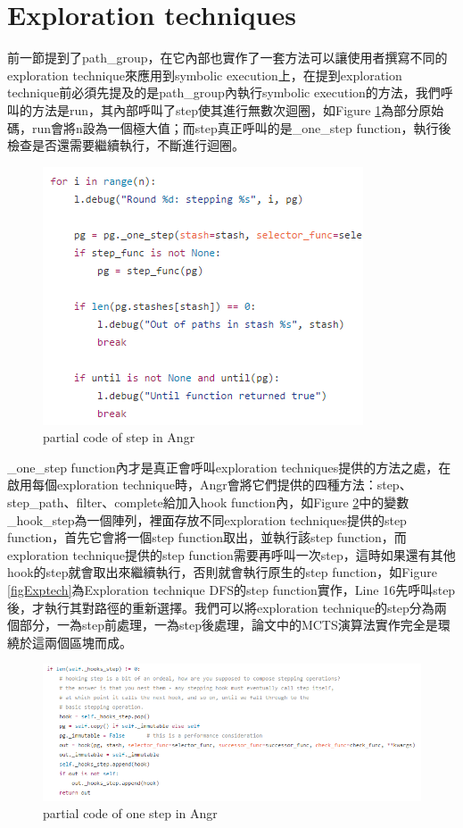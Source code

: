 \documentclass[12pt,a4paper,oneside]{book}
\begin{document}
\section{Exploration techniques}

前一節提到了path\_group，在它內部也實作了一套方法可以讓使用者撰寫不同的exploration technique來應用到symbolic execution上，在提到exploration technique前必須先提及的是path\_group內執行symbolic execution的方法，我們呼叫的方法是run，其內部呼叫了step使其進行無數次迴圈，如Figure \ref{figAngrStep}為部分原始碼，run會將n設為一個極大值；而step真正呼叫的是\_one\_step function，執行後檢查是否還需要繼續執行，不斷進行迴圈。

\begin{figure}[htbp]
\center
\includegraphics[]{figures/angrStep.png}
\caption{partial code of step in Angr \label{figAngrStep}}
\end{figure}

\_one\_step function內才是真正會呼叫exploration techniques提供的方法之處，在啟用每個exploration technique時，Angr會將它們提供的四種方法：step、step\_path、filter、complete給加入hook function內，如Figure \ref{figAngrOneStep}中的變數\_hook\_step為一個陣列，裡面存放不同exploration techniques提供的step function，首先它會將一個step function取出，並執行該step function，而exploration technique提供的step function需要再呼叫一次step，這時如果還有其他hook的step就會取出來繼續執行，否則就會執行原生的step function，如Figure \ref{figExptech}為Exploration technique DFS的step function實作，Line 16先呼叫step後，才執行其對路徑的重新選擇。我們可以將exploration technique的step分為兩個部分，一為step前處理，一為step後處理，論文中的MCTS演算法實作完全是環繞於這兩個區塊而成。

\begin{figure}[htbp]
\center
\includegraphics[]{figures/oneStep.png}
\caption{partial code of one step in Angr \label{figAngrOneStep}}
\end{figure}
\end{document}
